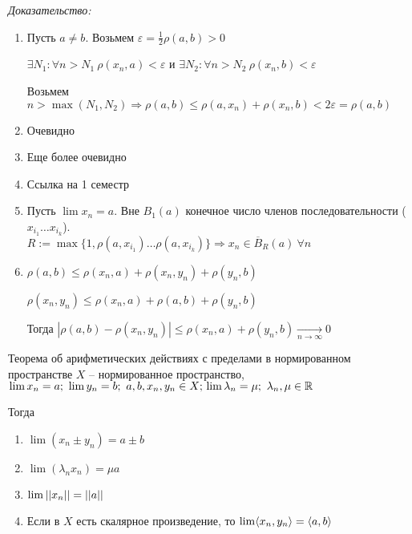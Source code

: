\documentclass[12pt]{article}
\begin{document}
\textit{Доказательство:}

\begin{enumerate}
    \item Пусть $a \neq b$. Возьмем $\varepsilon = \frac{1}{2}\rho(a, b) > 0$
    
    $\exists N_1 : \forall n > N_1\ \rho(x_n, a) < \varepsilon$ и $\exists N_2 : \forall n > N_2\ \rho(x_n, b) < \varepsilon$

    Возьмем $n > \max(N_1, N_2) \Rightarrow \rho(a, b) \leq \rho(a, x_n) + \rho(x_n, b) < 2\varepsilon = \rho(a, b)$

    \item Очевидно
    \item Еще более очевидно 
    \item Ссылка на 1 семестр
    \item Пусть $\lim x_n = a$. Вне $B_1(a)$ конечное число членов последовательности ($x_{i_1} \ldots x_{i_k}$). \\
    $R := \max\{1, \rho(a, x_{i_1}) \ldots \rho(a, x_{i_k})\} \Rightarrow x_n \in \overline{B}_R(a)\ \forall n$

    \item $\rho(a, b) \leq \rho(x_n, a) + \rho(x_n, y_n) + \rho(y_n, b)$
    
    $\rho(x_n, y_n) \leq \rho(x_n, a) + \rho(a, b) + \rho(y_n, b)$

    Тогда $|\rho(a, b) - \rho(x_n, y_n)| \leq \rho(x_n, a) + \rho(y_n, b) \xrightarrow[n \to \infty]{} 0$
\end{enumerate}

\begin{theo}{Теорема об арифметических действиях с пределами в нормированном пространстве}
    $X$ -- нормированное пространство, $\lim x_n = a;\ \lim y_n = b;\ a, b, x_n, y_n \in X;\\
    \lim \lambda_n = \mu;\ \lambda_n, \mu \in \R$

    Тогда

    \begin{enumerate}
        \item $\lim (x_n \pm y_n) = a \pm b$
        \item $\lim (\lambda_n x_n) = \mu a$
        \item $\lim || x_n || = || a ||$
        \item Если в $X$ есть скалярное произведение, то $\lim \langle x_n, y_n \rangle = \langle a, b \rangle$
    \end{enumerate}
\end{theo}
\end{document}

